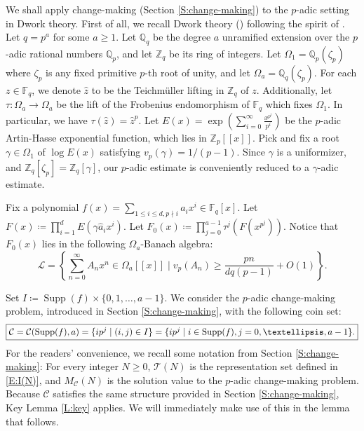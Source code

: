 \documentclass{amsart}
\numberwithin{equation}{section}
\newcommand{\Z}{\mathbb{Z}}
\newcommand{\Q}{\mathbb{Q}}
\newcommand{\F}{\mathbb{F}}
\newcommand{\cT}{\mathcal{T}}
\newcommand{\sL}{\mathscr{L}}
\newcommand{\cC}{\mathcal{C}}
\DeclareMathOperator{\Supp}{Supp}
\theoremstyle{plain}
\theoremstyle{definition}
\begin{document}
We shall apply change-making (Section \ref{S:change-making}) to the $p$-adic setting in Dwork theory.
First of all, we recall Dwork theory (\cite{Dw64}) following the spirit of \cite{Bom66}.
Let $q=p^a$ for some $a\ge 1$.
Let $\Q_q$ be the degree $a$ unramified extension over the $p$-adic
rational numbers $\Q_p$, and let $\Z_q$ be its ring of integers.
Let $\Omega_1 = \Q_p(\zeta_p)$
where $\zeta_p$ is any fixed primitive $p$-th root of unity,
and let $\Omega_a=\Q_q(\zeta_p)$. For each $z
\in \F_q$, we denote $\hat{z}$
to be the Teichm\"uller lifting in $\Z_q$ of $z$.  
Additionally, let $\tau : \Omega_a \to \Omega_a$ be the
lift of the Frobenius endomorphism of $\F_q$ which fixes $\Omega_1$.
In particular, we have $\tau(\hat{z})=\hat{z}^p$.
Let
$E(x) = \exp \left(\sum_{i=0}^{\infty}\frac{x^{p^i}}{p^i}\right)$ be the 
    $p$-adic Artin-Hasse exponential function, which lies in $\Z_p[[x]]$.
    Pick and fix a root $\gamma\in\Omega_1$ of $\log E(x)$
satisfying $v_p(\gamma) = 1/(p-1)$. 
Since $\gamma$ is a uniformizer, and $\Z_q[\zeta_p]=\Z_q[\gamma]$, 
our $p$-adic estimate is conveniently reduced to a $\gamma$-adic estimate.

Fix a polynomial $f(x)=\sum_{1\le i\le d,p\nmid i }a_i x^i\in \F_q[x]$.
Let 
$F(x)\coloneqq \prod_{i=1}^{d} E(\gamma\hat a_i x^i )$. 
Let 
$F_0(x) \coloneqq\prod_{j=0}^{a-1} \tau^{j}(F(x^{p^j}))$.
Notice that $F_0(x)$ lies in the following $\Omega_a$-Banach algebra:
$$
\sL=\left\{\sum_{n=0}^\infty A_n x^n\in \Omega_a[[x]]\;|\;
v_p(A_n)\ge \frac{pn}{dq(p-1)}+O(1)\right\}. 
$$ 


Set $I\coloneqq\Supp(f)\times \{0,1,\ldots,a-1\}.$ 
We consider the $p$-adic change-making problem, introduced in Section \ref{S:change-making},  
with the following coin set:
\begin{equation}\label{E:coin-set2}
\fbox{$\cC=\cC(\Supp(f),a)=\{ip^j\mid (i,j)\in I\}=\{ip^j\mid i\in\Supp(f), j=0,\ldots,a-1\}.$}
\end{equation}
For the readers' convenience, we recall some notation from 
Section \ref{S:change-making}:
For every integer $N\ge 0$, 
$\cT(N)$ is the representation set defined in \eqref{E:I(N)},
and $M_\cC(N)$ is the solution value to the $p$-adic change-making 
problem.
Because $\cC$ satisfies the same structure provided in
Section \ref{S:change-making},
Key Lemma \ref{L:key} applies.
We will immediately make use of this in the lemma that follows.
\end{document}
